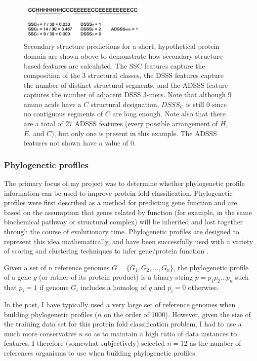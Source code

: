\documentclass{bioinfo}
\begin{document}
\begin{figure} \centering
  \includegraphics[width=240px]{../ss.png}
  \caption{Secondary structure predictions for a short, hypothetical protein domain are shown above to demonstrate how secondary-structure-based features are calculated. The SSC features capture the composition of the 3 structural classes, the DSSS features capture the number of distinct structural segments, and the ADSSS feature captures the number of adjacent DSSS 3-mers. Note that although 9 amino acids have a $C$ structural designation, $DSSS_C$ is still 0 since no contiguous segments of $C$ are long enough. Note also that there are a total of 27 ADSSS features (every possible arrangement of $H$, $E$, and $C$), but only one is present in this example. The ADSSS features not shown have a value of 0.}
  \label{SSGraphic}
\end{figure}

\subsubsection*{Phylogenetic profiles}
The primary focus of my project was to determine whether phylogenetic profile information can be used to improve protein fold classification.
Phylogenetic profiles were first described as a method for predicting gene function \citep{Pellegrini} and are based on the assumption that genes related by function (for example, in the same biochemical pathway or structural complex) will be inherited and lost together through the course of evolutionary time.
Phylogenetic profiles are designed to represent this idea mathematically, and have been successfully used with a variety of scoring and clustering techniques to infer gene/protein function \citep{Kensche}.

Given a set of $n$ reference genomes $G = \{G_1, G_2, ..., G_n\}$, the phylogenetic profile of a gene $g$ (or rather of its protein product) is a binary string $p = p_1 p_2 ... p_n$ such that $p_i = 1$ if genome $G_i$ includes a homolog of $g$ and $p_i = 0$ otherwise.

In the past, I have typically used a very large set of reference genomes when building phylogenetic profiles ($n$ on the order of 1000).
However, given the size of the training data set for this protein fold classification problem, I had to use a much more conservative $n$ so as to maintain a high ratio of data instances to features.
I therefore (somewhat subjectively) selected $n=12$ as the number of references organisms to use when building phylogenetic profiles.
\end{document}
